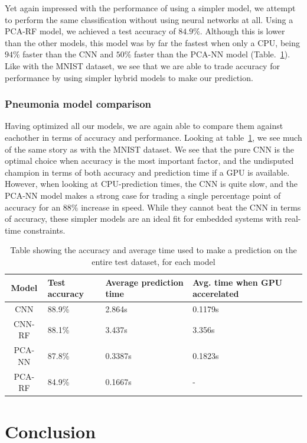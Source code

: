 \documentclass[onecolumn,10pt,cleanfoot]{asme2ej}
\begin{document}
Yet again impressed with the performance of using a simpler model, we attempt to perform the same classification without using neural networks at all. Using a PCA-RF model, we achieved a test accuracy of $84.9\%$. Although this is lower than the other models, this model was by far the fastest when only a CPU, being $94\%$ faster than the CNN and $50\%$ faster than the PCA-NN model (Table.~\ref{modcomppneu}). Like with the MNIST dataset, we see that we are able to trade accuracy for performance by using simpler hybrid models to make our prediction.

\subsubsection{Pneumonia model comparison}

Having optimized all our models, we are again able to compare them against eachother in terms of accuracy and performance. Looking at table~\ref{modcomppneu}, we see much of the same story as with the MNIST dataset. We see that the pure CNN is the optimal choice when accuracy is the most important factor, and the undisputed champion in terms of both accuracy and prediction time if a GPU is available. However, when looking at CPU-prediction times, the CNN is quite slow, and the PCA-NN model makes a strong case for trading a single percentage point of accuracy for an $88\%$ increase in speed. While they cannot beat the CNN in terms of accuracy, these simpler models are an ideal fit for embedded systems with real-time constraints.

\begin{table}[H]
\caption{Table showing the accuracy and average time used to make a prediction on the entire test dataset, for each model}
\begin{center}
\label{modcomppneu}
\begin{tabular}{| c | l | l | l |}
\hline
Model & Test accuracy & Average prediction time & Avg. time when GPU accerelated \\
\hline
CNN & 88.9\% & 2.864s & 0.1179s \\
CNN-RF & 88.1\% & 3.437s & 3.356s \\
PCA-NN & 87.8\% & 0.3387s & 0.1823s \\
PCA-RF & 84.9\% & 0.1667s & - \\
\hline
\end{tabular}
\end{center}
\end{table}

\section{Conclusion}
\end{document}
